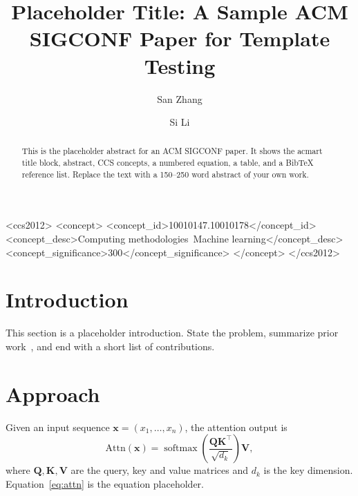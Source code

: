 \documentclass[sigconf,nonacm]{acmart}
\begin{document}
\title{Placeholder Title: A Sample ACM SIGCONF Paper for Template Testing}

\author{San Zhang}

\author{Si Li}

\renewcommand{\shortauthors}{Zhang and Li}

\begin{abstract}
This is the placeholder abstract for an ACM SIGCONF paper. It shows the acmart
title block, abstract, CCS concepts, a numbered equation, a table, and a BibTeX
reference list. Replace the text with a 150--250 word abstract of your own work.
\end{abstract}

\begin{CCSXML}
<ccs2012>
   <concept>
       <concept_id>10010147.10010178</concept_id>
       <concept_desc>Computing methodologies~Machine learning</concept_desc>
       <concept_significance>300</concept_significance>
   </concept>
</ccs2012>
\end{CCSXML}


\maketitle

\section{Introduction}
This section is a placeholder introduction. State the problem, summarize prior
work~\cite{vaswani2017attention}, and end with a short list of contributions.

\section{Approach}
Given an input sequence $\mathbf{x}=(x_1,\dots,x_n)$, the attention output is
\begin{equation}
  \mathrm{Attn}(\mathbf{x})=\operatorname{softmax}\!\left(\frac{\mathbf{Q}\mathbf{K}^{\top}}{\sqrt{d_k}}\right)\mathbf{V},
  \label{eq:attn}
\end{equation}
where $\mathbf{Q},\mathbf{K},\mathbf{V}$ are the query, key and value matrices and
$d_k$ is the key dimension. Equation~\eqref{eq:attn} is the equation placeholder.
\end{document}
